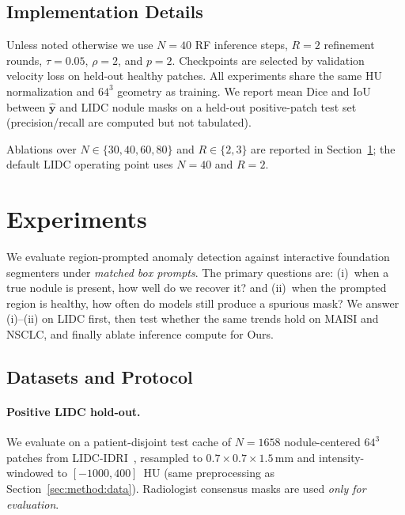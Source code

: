 \documentclass[letterpaper]{article} %
\begin{document}
\subsection{Implementation Details}
\label{sec:method:impl}

Unless noted otherwise we use \(N{=}40\) RF inference steps, \(R{=}2\)
refinement rounds, \(\tau{=}0.05\), \(\rho{=}2\), and \(p{=}2\).
Checkpoints are selected by validation velocity loss on held-out healthy
patches.
All experiments share the same HU normalization and \(64^{3}\) geometry as
training.
We report mean Dice and IoU between \(\hat{\mathbf{y}}\) and LIDC nodule
masks on a held-out positive-patch test set (precision/recall are computed
but not tabulated).

Ablations over \(N\in\{30,40,60,80\}\) and \(R\in\{2,3\}\) are reported in
Section~\ref{sec:experiments}; the default LIDC operating point uses
\(N{=}40\) and \(R{=}2\).

\section{Experiments}
\label{sec:experiments}

We evaluate region-prompted anomaly detection against
interactive foundation segmenters under \emph{matched box
prompts}. The primary questions are: (i)~when a true nodule is
present, how well do we recover it? and (ii)~when the prompted
region is healthy, how often do models still produce a spurious
mask? We answer (i)--(ii) on LIDC first, then test whether the
same trends hold on MAISI and NSCLC, and finally ablate inference
compute for Ours.

\subsection{Datasets and Protocol}
\paragraph{Positive LIDC hold-out.}
We evaluate on a patient-disjoint test cache of \(N{=}1658\) nodule-centered
\(64^3\) patches from LIDC-IDRI~\citep{lidc2011}, resampled to
\(0.7{\times}0.7{\times}1.5\,\mathrm{mm}\) and intensity-windowed to
\([-1000,400]\)~HU (same preprocessing as Section~\ref{sec:method:data}).
Radiologist consensus masks are used \emph{only for evaluation}.
\end{document}
